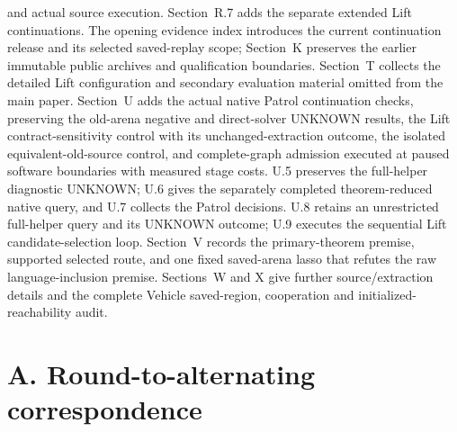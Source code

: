\documentclass[11pt]{article}
\begin{document}
and actual source execution. Section~R.7 adds the separate extended Lift
continuations.
The opening evidence index introduces the current continuation release
and its selected saved-replay scope; Section~K preserves the earlier
immutable public archives and qualification boundaries. Section~T collects the detailed
Lift configuration and secondary evaluation material omitted from the main paper.
Section~U adds the actual native Patrol continuation checks, preserving
the old-arena negative and direct-solver UNKNOWN results, the Lift
contract-sensitivity control with its unchanged-extraction outcome, the
isolated equivalent-old-source control, and complete-graph admission
executed at paused software boundaries with measured stage costs.
U.5 preserves the full-helper diagnostic UNKNOWN; U.6 gives the separately
completed theorem-reduced native query, and U.7 collects the Patrol decisions.
U.8 retains an unrestricted full-helper query and its UNKNOWN outcome;
U.9 executes the sequential Lift candidate-selection loop. Section~V
records the primary-theorem premise, supported selected route, and one
fixed saved-arena lasso that refutes the raw language-inclusion premise.
Sections~W and X give further source/extraction details and the complete
Vehicle saved-region, cooperation and initialized-reachability audit.

\section*{A. Round-to-alternating correspondence}
\end{document}
